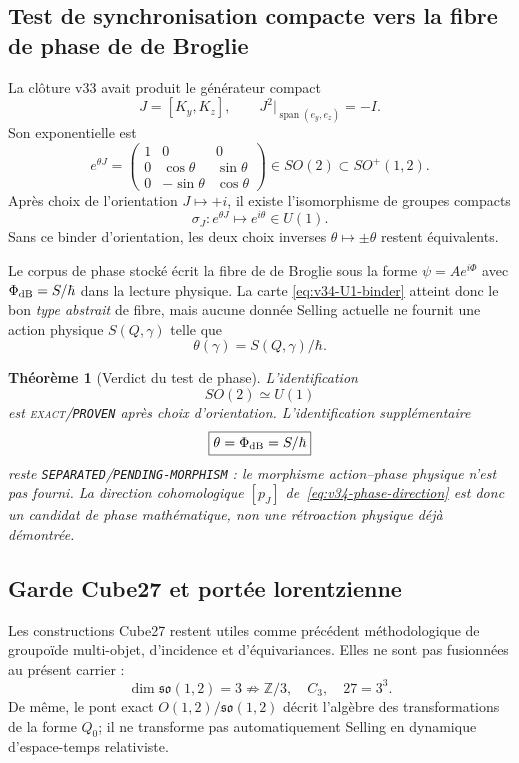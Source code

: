 \documentclass[11pt,a4paper]{article}
\newtheorem{theorem}{Théorème}[section]
\newcommand{\statusExact}{\textsc{exact}}
\newcommand{\certProven}{\texttt{PROVEN}}
\newcommand{\certSeparated}{\texttt{SEPARATED}}
\newcommand{\certPending}{\texttt{PENDING-MORPHISM}}
\begin{document}
\subsection{Test de synchronisation compacte vers la fibre de phase de de Broglie}

La clôture v33 avait produit le générateur compact
\[
 J=[K_y,K_z],
 \qquad
 J^2|_{\operatorname{span}(e_y,e_z)}=-I.
\]
Son exponentielle est
\begin{equation}\label{eq:v34-expJ}
 \boxed{
 e^{\theta J}
 =\begin{pmatrix}
 1&0&0\\
 0&\cos\theta&\sin\theta\\
 0&-\sin\theta&\cos\theta
 \end{pmatrix}
 \in SO(2)\subset SO^+(1,2).}
\end{equation}
Après choix de l'orientation $J\mapsto +i$, il existe l'isomorphisme de groupes compacts
\begin{equation}\label{eq:v34-U1-binder}
 \boxed{
 \sigma_J:e^{\theta J}\longmapsto e^{i\theta}\in U(1).}
\end{equation}
Sans ce binder d'orientation, les deux choix inverses $\theta\mapsto\pm\theta$ restent équivalents.

Le corpus de phase stocké écrit la fibre de de Broglie sous la forme
$\psi=Ae^{i\Phi}$ avec $\Phi_{\rm dB}=S/\hbar$ dans la lecture physique. La carte
\eqref{eq:v34-U1-binder} atteint donc le bon \emph{type abstrait} de fibre, mais aucune donnée
Selling actuelle ne fournit une action physique $S(Q,\gamma)$ telle que
\[
 \theta(\gamma)=S(Q,\gamma)/\hbar.
\]

\begin{theorem}[Verdict du test de phase]\label{thm:v34-debroglie-verdict}
L'identification
\[
 SO(2)\simeq U(1)
\]
est \statusExact{}/\certProven{} après choix d'orientation. L'identification supplémentaire
\[
 \boxed{\theta=\Phi_{\rm dB}=S/\hbar}
\]
reste \certSeparated{}/\certPending{} : le morphisme action--phase physique n'est pas fourni.
La direction cohomologique $[p_J]$ de~\eqref{eq:v34-phase-direction} est donc un candidat de phase
mathématique, non une rétroaction physique déjà démontrée.
\end{theorem}

\subsection{Garde Cube27 et portée lorentzienne}

Les constructions Cube27 restent utiles comme précédent méthodologique de groupoïde multi-objet,
d'incidence et d'équivariances. Elles ne sont pas fusionnées au présent carrier :
\[
 \dim\mathfrak{so}(1,2)=3
 \not\Rightarrow
 \mathbb Z/3,
 \quad C_3,
 \quad 27=3^3.
\]
De même, le pont exact $O(1,2)/\mathfrak{so}(1,2)$ décrit l'algèbre des transformations de la
forme $Q_0$; il ne transforme pas automatiquement Selling en dynamique d'espace-temps relativiste.
\end{document}
